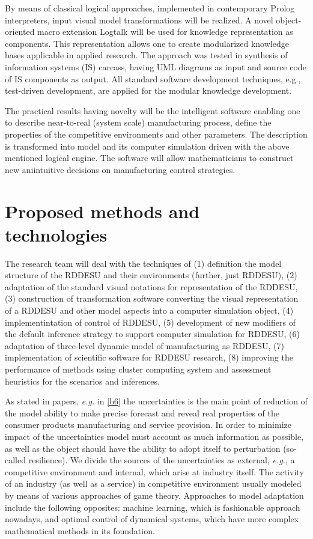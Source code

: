 \documentclass[runningheads]{llncs}
\begin{document}
By means of classical logical approaches, implemented in contemporary Prolog interpreters, input visual model transformations will be realized. A novel object-oriented macro extension Logtalk will be used for knowledge representation as components. This representation allows one to create modularized knowledge bases applicable in applied research. The approach was tested in synthesis of information systems (IS) carcass, having UML diagrams as input and source code of IS components as output. All standard software development techniques, e.g., test-driven development, are applied for the modular knowledge development.

The practical results having novelty will be the intelligent software enabling one to describe near-to-real (system scale) manufacturing process, define the properties of the competitive environments and other parameters. The description is transformed into model and its computer simulation driven with the above mentioned logical engine. The software will allow mathematicians to construct new aniintuitive decisions on manufacturing control strategies.

\section{Proposed methods and technologies}
\label{sec:methods}

The research team will deal with the techniques of (1) definition the model structure of the RDDESU and their environments (further, just RDDESU), (2) adaptation of the standard visual notations for representation of the RDDESU,  (3) construction of transformation software converting the visual representation of a RDDESU and other model aspects into a computer simulation object, (4) implementintation of control of RDDESU, (5) development of new modifiers of the default inference strategy to support computer simulation for RDDESU, (6) adaptation of three-level dynamic model of manufacturing as RDDESU, (7) implementation of scientific software for RDDESU research, (8) improving the performance of methods using cluster computing system and assessment heuristics for the scenarios and inferences.

As stated in papers, \emph{e.g.} in \ref{b6} the uncertainties is the main point of reduction of the model ability to make precise forecast and reveal real properties of the consumer products manufacturing and service provision. In order to minimize impact of the uncertainties model must account as much information as possible, as well as the object should have the ability to adopt itself to perturbation (so-called resilience). We divide the sources of the uncertainties as external, \emph{e.g.}, a competitive environment and internal, which arise at industry itself. The activity of an industry (as well as a service) in competitive environment usually modeled by means of various approaches of game theory. Approaches to model adaptation include the following opposites: machine learning, which is fashionable approach nowadays, and optimal control of dynamical systems, which have more complex mathematical methods in its foundation.
\end{document}
